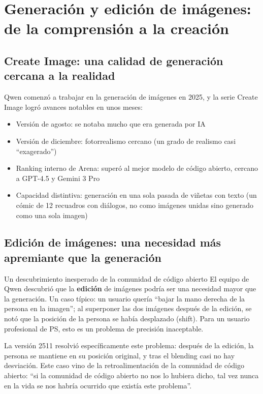 \section{Generación y edición de imágenes: de la comprensión a la creación}

\subsection{Create Image: una calidad de generación cercana a la realidad}

Qwen comenzó a trabajar en la generación de imágenes en 2025, y la serie Create Image logró avances notables en unos meses:

\begin{itemize}
    \item Versión de agosto: se notaba mucho que era generada por IA
    \item Versión de diciembre: fotorrealismo cercano (un grado de realismo casi ``exagerado'')
    \item Ranking interno de Arena: superó al mejor modelo de código abierto, cercano a GPT-4.5 y Gemini 3 Pro
    \item Capacidad distintiva: generación en una sola pasada de viñetas con texto (un cómic de 12 recuadros con diálogos, no como imágenes unidas sino generado como una sola imagen)
\end{itemize}

\subsection{Edición de imágenes: una necesidad más apremiante que la generación}

\begin{importantbox}{Un descubrimiento inesperado de la comunidad de código abierto}
El equipo de Qwen descubrió que la \textbf{edición} de imágenes podría ser una necesidad mayor que la generación. Un caso típico: un usuario quería ``bajar la mano derecha de la persona en la imagen''; al superponer las dos imágenes después de la edición, se notó que la posición de la persona se había desplazado (shift). Para un usuario profesional de PS, esto es un problema de precisión inaceptable.

La versión 2511 resolvió específicamente este problema: después de la edición, la persona se mantiene en su posición original, y tras el blending casi no hay desviación. Este caso vino de la retroalimentación de la comunidad de código abierto: ``si la comunidad de código abierto no nos lo hubiera dicho, tal vez nunca en la vida se nos habría ocurrido que existía este problema''.
\end{importantbox}

